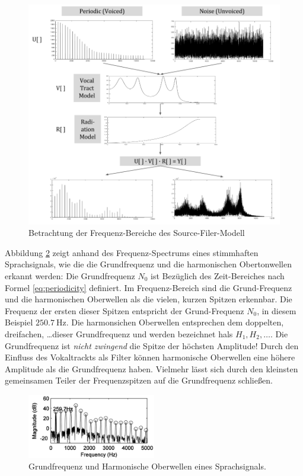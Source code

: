 \begin{figure}[h]
	\centering
	\includegraphics[width=1\textwidth]{bilder/sourceFilterSpectra.png}
	\caption{Betrachtung der Frequenz-Bereiche des Source-Filer-Modell }
	\label{img:sourceFilerSpectra}
\end{figure}	

Abbildung \ref{img:pitchPeaks} zeigt anhand des Frequenz-Spectrums eines stimmhaften Sprachsignals, wie die die Grundfrequenz und die harmonischen Obertonwellen erkannt werden: Die Grundfrequenz $N_0$ ist Bezüglich des Zeit-Bereiches nach Formel \ref{eq:periodicity} definiert. Im Frequenz-Bereich sind die Grund-Frequenz und die harmonischen Oberwellen als die \glqq vielen, kurzen Spitzen\grqq{} erkennbar. Die Frequenz der ersten dieser Spitzen entspricht der Grund-Frequenz $N_0$, in diesem Beispiel $\SI{250.7}{\hertz}$. Die harmonsichen Oberwellen entsprechen dem doppelten, dreifachen, \ldots dieser Grundfrequenz und werden bezeichnet hals $H_1, H_2, \ldots$. Die Grundfrequenz ist \emph{nicht zwingend} die Spitze der höchsten Amplitude! Durch den Einfluss des Vokaltrackts als Filter können harmonische Oberwellen eine höhere Amplitude als die Grundfrequenz haben. Vielmehr lässt sich durch den kleinsten gemeinsamen Teiler der Frequenzspitzen auf die Grundfrequenz schließen.\cite[S. 52 - 53]{sprachverarbeitung}

\begin{figure}[h]
	\centering
	\includegraphics[width=0.5\textwidth]{bilder/pitchPeaks.png}
	\caption{ Grundfrequenz und Harmonische Oberwellen eines Sprachsignals.}
	\label{img:pitchPeaks}
\end{figure}	

